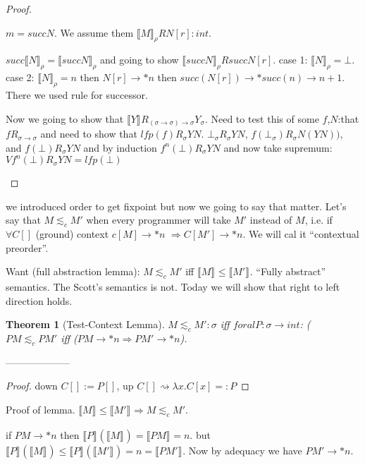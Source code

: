 \documentclass[a4paper,10pt]{book}
\newtheorem{theorem}{Theorem}
\newcommand{\sem}[2]{ \llbracket#1\rrbracket_{#2} }
\newcommand{\rarr}{ \rightarrow }
\begin{document}
\begin{proof}
\begin{enumerate}
  $m=succ N$. We assume them $\sem{M}{\rho}RN[r]: int$.
  
  $succ\sem{N}{\rho} = \sem{succ N}{\rho}$ and going to show $\sem{succ N}{\rho} R succ N[r]$.
  case 1: $\sem{N}{\rho}=\bot$. case 2: $\sem{N}{\rho} = n$ then $N[r] \rarr * n$ then 
  $succ(N[r]) \rarr* succ(n) \rarr n+1$. There we used rule for successor.
  
  Now we going to show that $\sem{Y}{}R_{(\sigma\rarr\sigma)\rarr \sigma}Y_\sigma$. Need to test
  this of some $f$,$N$:that $fR_{\sigma\rarr\sigma}$ and need to show that $lfp(f)R_\sigma YN$.
  $\bot_{\sigma}R_\sigma YN$, $f(\bot_\sigma)R_\sigma N(YN))$, and $f(\bot)R_\sigma YN$ and by 
  induction $f^n(\bot)R_\sigma YN$  and now take supremum: $V f^n(\bot)R_\sigma YN = lfp(\bot)$
  
 \end{enumerate}

\end{proof}

we introduced order to get fixpoint but now we going to say that matter. Let's say that
$M \lesssim_{c} M'$ when every programmer will take $M'$ instead of $M$, i.e.
if $\forall C[]$ (ground) context $c[M] \rarr*n$ $\Rightarrow C[M']\rarr*n$. We will 
cal it ``contextual preorder''.

Want (full abstraction lemma): $M\lesssim_c M'$ iff $\sem{M}{} \leqslant \sem{M'}{}$. ``Fully abstract'' semantics.
The Scott's semantics is not. Today we will show that right to left direction holds.

\begin{theorem}[Test-Context Lemma]
 $M \lesssim_c M': \sigma$ iff $foral P: \sigma \rarr int$: ($PM \lesssim_c PM'$ iff
 ($PM \rarr * n \Rightarrow PM' \rarr* n$).
 
\end{theorem}
--------------------
\begin{proof}
 down $C[] := P[]$, up $C[] \rightsquigarrow \lambda x. C[x]=:P$
\end{proof}

 Proof of lemma.
 $\sem{M}{} \leqslant \sem{M'}{} \Rightarrow M \lesssim_c M'$.
 
 if $PM \rarr * n$ then $\sem{P}{}(\sem{M}{}) = \sem{PM}{}=n$. but 
 $\sem{P}{}(\sem{M}{}) \leqslant \sem{P}{}(\sem{M'}{}) = n = \sem{PM'}{}$. Now by adequacy we have 
 $PM'\rarr* n$.
\end{document}
